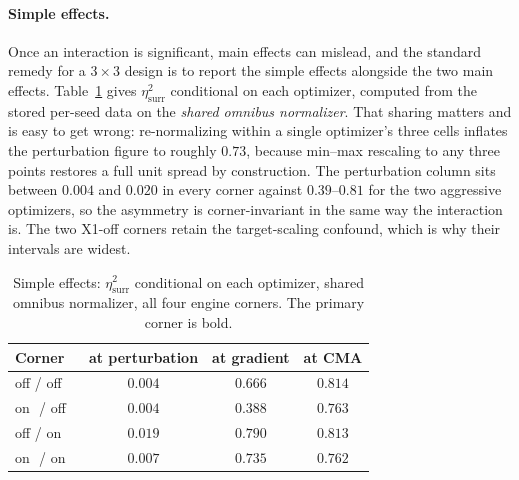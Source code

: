\documentclass[letterpaper]{article}
\theoremstyle{plain}
\begin{document}
\paragraph{Simple effects.} Once an interaction is significant, main effects can mislead, and the standard remedy for a $3\times3$ design is to report the simple effects alongside the two main effects. Table~\ref{tab:simple} gives $\eta^2_{\text{surr}}$ conditional on each optimizer, computed from the stored per-seed data on the \emph{shared omnibus normalizer}. That sharing matters and is easy to get wrong: re-normalizing within a single optimizer's three cells inflates the perturbation figure to roughly $0.73$, because min--max rescaling to any three points restores a full unit spread by construction. The perturbation column sits between $0.004$ and $0.020$ in every corner against $0.39$--$0.81$ for the two aggressive optimizers, so the asymmetry is corner-invariant in the same way the interaction is. The two X1-off corners retain the target-scaling confound, which is why their intervals are widest.

\begin{table}[t]\centering
\caption{Simple effects: $\eta^2_{\text{surr}}$ conditional on each optimizer, shared omnibus normalizer, all four engine corners. The primary corner is bold.}
\label{tab:simple}
\small
\begin{tabular}{lccc}
\toprule
Corner & at perturbation & at gradient & at CMA \\
\midrule
off / off & $0.004$ & $0.666$ & $0.814$ \\
on\ \,/ off & $0.004$ & $0.388$ & $0.763$ \\
off / on\ \, & $0.019$ & $0.790$ & $0.813$ \\
on\ \,/ on\ \, & $\mathbf{0.007}$ & $\mathbf{0.735}$ & $\mathbf{0.762}$ \\
\bottomrule
\end{tabular}
\end{table}
\end{document}
